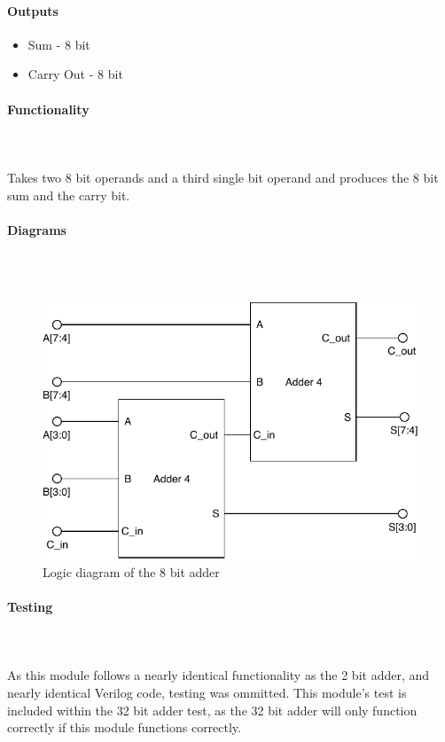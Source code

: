 \documentclass{article}
\begin{document}
    \paragraph{Outputs}
    \begin{itemize}
        \item Sum - 8 bit
        \item Carry Out - 8 bit
    \end{itemize}

    \paragraph{Functionality}
    \hfill\\\\
    Takes two 8 bit operands and a third single bit operand and produces the
    8 bit sum and the carry bit.

    \paragraph{Diagrams}
    \hfill\\\\
    \begin{figure}[H]
        \centering
        \includegraphics{../diagrams/alu/adder/adder_8.pdf}
        \caption{Logic diagram of the 8 bit adder}
    \end{figure}

    \paragraph{Testing}
    \hfill\\\\
    As this module follows a nearly identical functionality as the 2
    bit adder, and nearly identical Verilog code, testing was ommitted.
    This module's test is included within the 32 bit adder test, as the
    32 bit adder will only function correctly if this module functions
    correctly.
\end{document}
